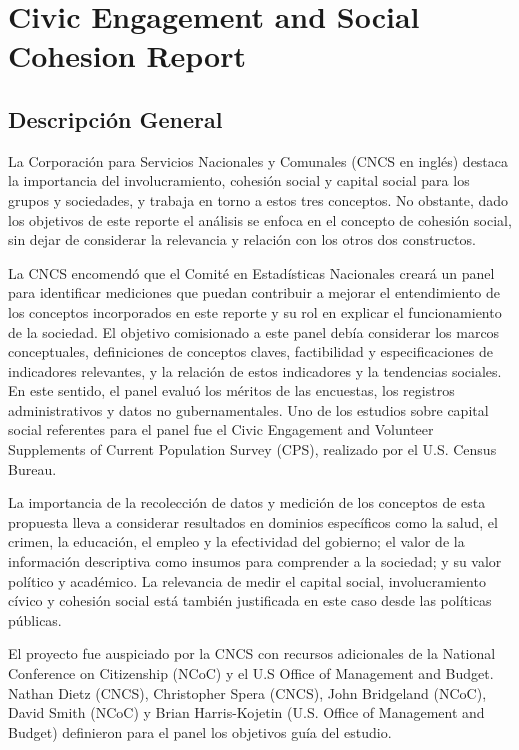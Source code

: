 \documentclass[
  12pt,
]{book}
\begin{document}
\hypertarget{civic-engagement-and-social-cohesion-report}{%
\chapter{Civic Engagement and Social Cohesion Report}\label{civic-engagement-and-social-cohesion-report}}

\hypertarget{descripciuxf3n-general-3}{%
\section{Descripción General}\label{descripciuxf3n-general-3}}

La Corporación para Servicios Nacionales y Comunales (CNCS en inglés) destaca la importancia del involucramiento, cohesión social y capital social para los grupos y sociedades, y trabaja en torno a estos tres conceptos. No obstante, dado los objetivos de este reporte el análisis se enfoca en el concepto de cohesión social, sin dejar de considerar la relevancia y relación con los otros dos constructos.

La CNCS encomendó que el Comité en Estadísticas Nacionales creará un panel para identificar mediciones que puedan contribuir a mejorar el entendimiento de los conceptos incorporados en este reporte y su rol en explicar el funcionamiento de la sociedad. El objetivo comisionado a este panel debía considerar los marcos conceptuales, definiciones de conceptos claves, factibilidad y especificaciones de indicadores relevantes, y la relación de estos indicadores y la tendencias sociales. En este sentido, el panel evaluó los méritos de las encuestas, los registros administrativos y datos no gubernamentales. Uno de los estudios sobre capital social referentes para el panel fue el Civic Engagement and Volunteer Supplements of Current Population Survey (CPS), realizado por el U.S. Census Bureau.

La importancia de la recolección de datos y medición de los conceptos de esta propuesta lleva a considerar resultados en dominios específicos como la salud, el crimen, la educación, el empleo y la efectividad del gobierno; el valor de la información descriptiva como insumos para comprender a la sociedad; y su valor político y académico. La relevancia de medir el capital social, involucramiento cívico y cohesión social está también justificada en este caso desde las políticas públicas.

El proyecto fue auspiciado por la CNCS con recursos adicionales de la National Conference on Citizenship (NCoC) y el U.S Office of Management and Budget. Nathan Dietz (CNCS), Christopher Spera (CNCS), John Bridgeland (NCoC), David Smith (NCoC) y Brian Harris-Kojetin (U.S. Office of Management and Budget) definieron para el panel los objetivos guía del estudio.
\end{document}
